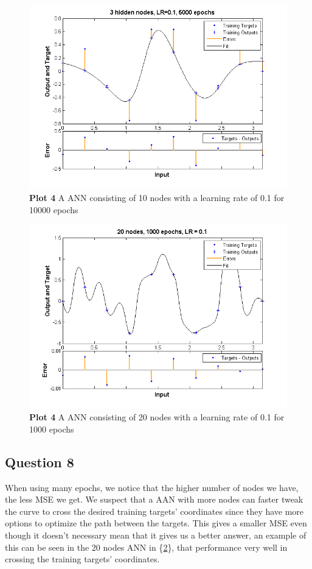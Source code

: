 \documentclass[a4paper]{article}
\begin{document}
\begin{figure}[h!] %
	\includegraphics[scale=0.8]{plot4_3nodes.png}
	\caption{\label{fig:plot4_10nodes.png}\textbf{Plot 4} A ANN consisting of 10 nodes with a learning rate of 0.1 for 10000 epochs}
\end{figure}
\begin{figure}[h!] %
	\includegraphics[scale=0.8]{plot4_20nodes.png}
	\caption{\label{fig:plot4_20nodes.png}\textbf{Plot 4} A ANN consisting of 20 nodes with a learning rate of 0.1 for 1000 epochs}
\end{figure}

\subsection*{Question 8}
When using many epochs, we notice that the higher number of nodes we have, the less MSE we get. We suspect that a AAN with more nodes can faster tweak the curve to cross the desired training targets' coordinates since they have more options to optimize the path between the targets. This gives a smaller MSE even though it doesn't necessary mean that it gives us a better answer, an example of this can be seen in the 20 nodes ANN in \{\ref{fig:plot4_20nodes.png}\}, that performance very well in crossing the training targets' coordinates.
\end{document}
